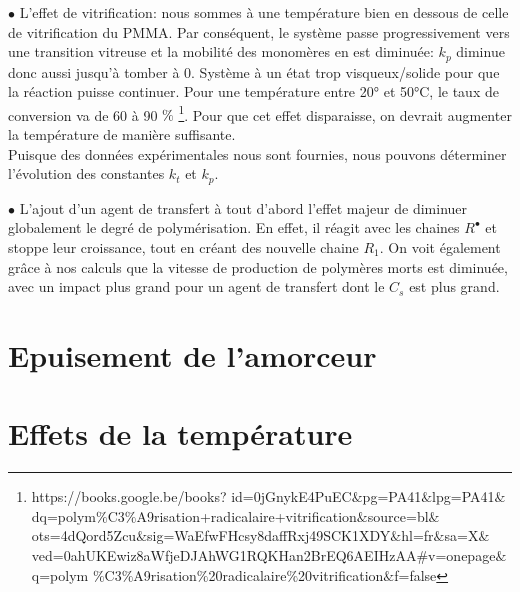 \documentclass[a4paper,oneside,12pt]{article}
\begin{document}
$\bullet$ L'effet de vitrification: nous sommes à une température bien en dessous de celle de vitrification du PMMA. Par conséquent, le système passe progressivement vers une transition vitreuse et la mobilité des monomères en est diminuée: $k_p$ diminue donc aussi jusqu'à tomber à 0. Système à un état trop visqueux/solide pour que la réaction puisse continuer. Pour une température entre 20° et 50°C, le taux de conversion va de 60 à 90 $\%$ \footnote{https://books.google.be/books?
id=0jGnykE4PuEC$\&$pg=PA41$\&$lpg=PA41$\&$dq=polym$\%$C3$\%$A9risation+radicalaire+vitrification$\&$source=bl$\&$ots=4dQord5Zcu$\&$sig=WaEfwFHcsy8daffRxj49SCK1XDY$\&$hl=fr$\&$sa=X$\&$ved=0ahUKEwiz8aWfjeDJAhWG1RQKHan2BrEQ6AEIHzAA$\#$v=onepage$\&$q=polym
$\%$C3$\%$A9risation$\%$20radicalaire$\%$20vitrification$\&$f=false}.
Pour que cet effet disparaisse, on devrait augmenter la température de manière suffisante.\\
Puisque des données expérimentales nous sont fournies, nous pouvons déterminer l'évolution des constantes $k_t$ et $k_p$.\\

\space

$\bullet$ L'ajout d'un agent de transfert à tout d'abord l'effet majeur de diminuer globalement le degré de polymérisation. En effet, il réagit avec les chaines $R^\bullet$ et stoppe leur croissance, tout en créant des nouvelle chaine $R_1$. On voit également grâce à nos calculs que la vitesse de production de polymères morts est diminuée, avec un impact plus grand pour un agent de transfert dont le $C_s$ est plus grand.

\part{Epuisement de l'amorceur}

\part{Effets de la température}
\end{document}
